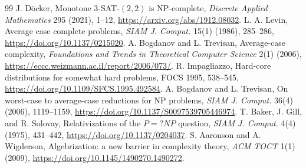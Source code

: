 \documentclass[11pt]{article}
\begin{document}
\begin{thebibliography}{99}
 J. D\"ocker, Monotone 3-SAT-\((2,2)\) is NP-complete,
\emph{Discrete Applied Mathematics} 295 (2021), 1--12,
\url{https://arxiv.org/abs/1912.08032}.
 L. A. Levin, Average case complete problems,
\emph{SIAM J. Comput.} 15(1) (1986), 285--286,
\url{https://doi.org/10.1137/0215020}.
 A. Bogdanov and L. Trevisan, Average-case complexity,
\emph{Foundations and Trends in Theoretical Computer Science} 2(1) (2006),
\url{https://eccc.weizmann.ac.il/report/2006/073/}.
 R. Impagliazzo, Hard-core distributions for somewhat
hard problems, FOCS 1995, 538--545,
\url{https://doi.org/10.1109/SFCS.1995.492584}.
 A. Bogdanov and L. Trevisan, On worst-case to average-case
reductions for NP problems, \emph{SIAM J. Comput.} 36(4) (2006), 1119--1159,
\url{https://doi.org/10.1137/S0097539705446974}.
 T. Baker, J. Gill, and R. Solovay, Relativizations of the
\(P=?NP\) question, \emph{SIAM J. Comput.} 4(4) (1975), 431--442,
\url{https://doi.org/10.1137/0204037}.
 S. Aaronson and A. Wigderson, Algebrization: a new barrier in
complexity theory, \emph{ACM TOCT} 1(1) (2009),
\url{https://doi.org/10.1145/1490270.1490272}.
\end{thebibliography}

\end{document}
